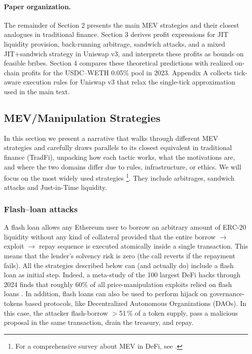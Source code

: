 \documentclass[a4paper,11pt]{article}
\begin{document}
\paragraph{Paper organization.}
The remainder of Section 2 presents the main MEV strategies and their closest analogues in traditional finance. Section 3 derives profit expressions for JIT liquidity provision, back-running arbitrage, sandwich attacks, and a mixed JIT+sandwich strategy in Uniswap v3, and interprets these profits as bounds on feasible bribes. Section 4 compares these theoretical predictions with realized on-chain profits for the USDC--WETH 0.05\% pool in 2023. Appendix A collects tick-aware execution rules for Uniswap v3 that relax the single-tick approximation used in the main text.
\subsection{MEV/Manipulation Strategies}
In this section we present  a narrative that walks through different MEV strategies and carefully draws parallels to its closest equivalent in traditional finance (TradFi), unpacking how each tactic works, what the motivations are, and where the two domains differ due to rules, infrastructure, or ethics. 
We will focus on the most widely used strategies \footnote{For a comprehensive survey about MEV in DeFi, see \cite{materwala2024maximal}.}. They include arbitrages, sandwich attacks and Just-in-Time liquidity. 

\subsubsection{Flash--loan attacks}
\label{subsec:flashloans}

A flash loan allows any Ethereum user to borrow  an arbitrary amount of ERC-20 liquidity without any kind of collateral provided that the entire borrow $\rightarrow$ exploit $\rightarrow$ repay sequence is executed atomically inside a single transaction.  This means that the lender’s solvency risk is zero (the call reverts if the repayment fails). All the strategies described below can (and actually do) include a flash loan as initial step. Indeed, a meta-study of the 100 largest DeFi hacks through 2024 finds that roughly
60\% of all price-manipulation exploits relied on flash loans
\cite{halborn2024survey}. In addition, flash loans can also be used to perform hijack on governance-tokens based protocols, like Decentralized Autonomous Organizations (DAOs). In this case, the attacker flash-borrow $>$51\,\% of a token supply, pass a malicious proposal in the same transaction, drain the treasury, and repay.
\end{document}
